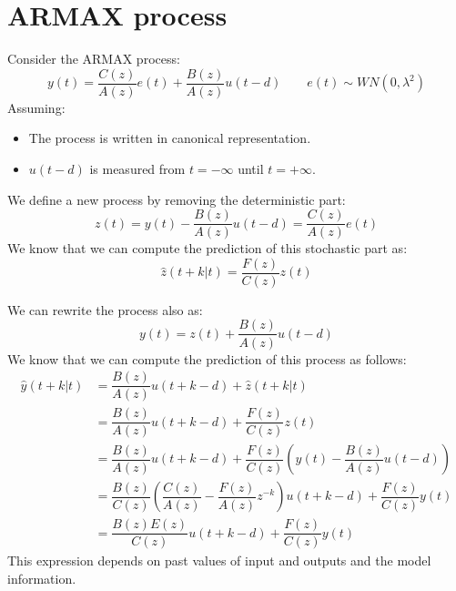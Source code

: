 \section{ARMAX process}

Consider the ARMAX process:
\[y(t)=\dfrac{C(z)}{A(z)}e(t)+\dfrac{B(z)}{A(z)}u(t-d) \qquad e(t)\sim WN(0,\lambda^2)\]
Assuming:
\begin{itemize}
    \item The process is written in canonical representation.
    \item $u(t-d)$ is measured from $t=-\infty$ until $t=+\infty$.
\end{itemize} 
We define a new process by removing the deterministic part:
\[z(t)=y(t)-\dfrac{B(z)}{A(z)}u(t-d)=\dfrac{C(z)}{A(z)}e(t)\]
We know that we can compute the prediction of this stochastic part as:
\[\hat{z}(t+k|t)=\dfrac{F(z)}{C(z)}z(t)\]

We can rewrite the process also as:
\[y(t)=z(t)+\dfrac{B(z)}{A(z)}u(t-d)\]
We know that we can compute the prediction of this process as follows:
\begin{align*}
    \hat{y}(t+k|t)  &=\dfrac{B(z)}{A(z)}u(t+k-d)+\hat{z}(t+k|t) \\
                    &=\dfrac{B(z)}{A(z)}u(t+k-d)+\dfrac{F(z)}{C(z)}z(t) \\
                    &=\dfrac{B(z)}{A(z)}u(t+k-d)+\dfrac{F(z)}{C(z)}\left( y(t)-\dfrac{B(z)}{A(z)}u(t-d) \right) \\
                    &=\dfrac{B(z)}{C(z)}\left( \dfrac{C(z)}{A(z)} - \dfrac{F(z)}{A(z)}z^{-k} \right)u(t+k-d) + \dfrac{F(z)}{C(z)}y(t) \\
                    &=\dfrac{B(z)E(z)}{C(z)}u(t+k-d) + \dfrac{F(z)}{C(z)}y(t) 
\end{align*}
This expression depends on past values of input and outputs and the model information.